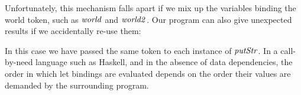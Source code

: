 Unfortunately, this mechanism falls apart if we mix up the variables binding the world token, such as $\operatorname{\mathit{world}}$ and $\operatorname{\mathit{world2}}$. Our program can also give unexpected results if we accidentally re-use them:


In this case we have passed the same token to each instance of $\operatorname{\mathit{putStr}}$. In a call-by-need language such as Haskell, and in the absence of data dependencies, the order in which let bindings are evaluated depends on the order their values are demanded by the surrounding program. 
